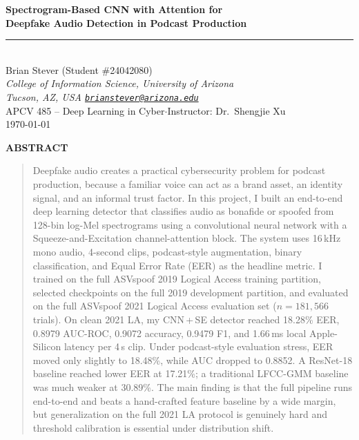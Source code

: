 \documentclass[11pt, letterpaper]{article}
\renewenvironment{abstract}{%
  \begin{center}\bfseries\color{accentink} ABSTRACT \end{center}
  \vspace{-0.4em}
  \begin{quote}\small\itshape\noindent\ignorespaces
}{%
  \end{quote}\vspace{0.5em}
}
\begin{document}

\thispagestyle{titlestyle}

\begin{center}
{\Large\bfseries Spectrogram-Based CNN with Attention for}\\[0.15em]
{\Large\bfseries Deepfake Audio Detection in Podcast Production}\\[0.4em]
{\color{accentink}\rule{\textwidth}{0.6pt}}\\[1.2em]

{\large Brian Stever \quad \small (Student \#24042080)}\\[0.4em]
{\itshape College of Information Science, University of Arizona}\\[0.15em]
{\itshape Tucson, AZ, USA \quad \texttt{\href{mailto:brianstever@arizona.edu}{brianstever@arizona.edu}}}\\[0.6em]
{\small APCV 485 -- Deep Learning in Cyber\quad$\cdot$\quad Instructor: Dr.\ Shengjie Xu}\\[0.15em]
{\small \today}\\[1.0em]
\end{center}

\begin{abstract}
Deepfake audio creates a practical cybersecurity problem for podcast production, because a familiar voice can act as a brand asset, an identity signal, and an informal trust factor. In this project, I built an end-to-end deep learning detector that classifies audio as bonafide or spoofed from 128-bin log-Mel spectrograms using a convolutional neural network with a Squeeze-and-Excitation channel-attention block. The system uses 16\,kHz mono audio, 4-second clips, podcast-style augmentation, binary classification, and Equal Error Rate (EER) as the headline metric. I trained on the full ASVspoof 2019 Logical Access training partition, selected checkpoints on the full 2019 development partition, and evaluated on the full ASVspoof 2021 Logical Access evaluation set ($n=181{,}566$ trials). On clean 2021 LA, my CNN\,+\,SE detector reached 18.28\% EER, 0.8979 AUC-ROC, 0.9072 accuracy, 0.9479 F1, and 1.66\,ms local Apple-Silicon latency per 4\,s clip. Under podcast-style evaluation stress, EER moved only slightly to 18.48\%, while AUC dropped to 0.8852. A ResNet-18 baseline reached lower EER at 17.21\%; a traditional LFCC-GMM baseline was much weaker at 30.89\%. The main finding is that the full pipeline runs end-to-end and beats a hand-crafted feature baseline by a wide margin, but generalization on the full 2021 LA protocol is genuinely hard and threshold calibration is essential under distribution shift.
\end{abstract}
\end{document}
